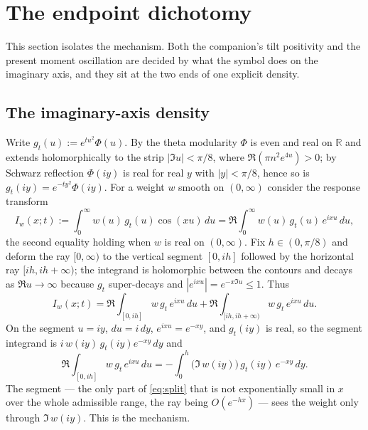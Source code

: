 \documentclass[11pt,reqno]{amsart}
\theoremstyle{plain}
\theoremstyle{definition}
\theoremstyle{remark}
\newcommand{\R}{\mathbb R}
\begin{document}
\section{The endpoint dichotomy}\label{sec:dichotomy}

This section isolates the mechanism. Both the companion's tilt positivity
and the present moment oscillation are decided by what the symbol does on
the imaginary axis, and they sit at the two ends of one explicit density.

\subsection{The imaginary-axis density}
Write $g_t(u):=e^{tu^2}\Phi(u)$. By the theta modularity $\Phi$ is even and
real on $\R$ and extends holomorphically to the strip $|\Im u|<\pi/8$, where
$\Re(\pi n^2e^{4u})>0$; by Schwarz reflection $\Phi(iy)$ is real for real
$y$ with $|y|<\pi/8$, hence so is $g_t(iy)=e^{-ty^2}\Phi(iy)$. For a weight
$w$ smooth on $(0,\infty)$ consider the response transform
\begin{equation}\label{eq:Iw}
  I_w(x;t):=\int_0^\infty w(u)\,g_t(u)\cos(xu)\,du
  =\Re\int_0^\infty w(u)\,g_t(u)\,e^{ixu}\,du ,
\end{equation}
the second equality holding when $w$ is real on $(0,\infty)$. Fix
$h\in(0,\pi/8)$ and deform the ray $[0,\infty)$ to the vertical segment
$[0,ih]$ followed by the horizontal ray $[ih,ih+\infty)$; the integrand is
holomorphic between the contours and decays as $\Re u\to\infty$ because
$g_t$ super-decays and $|e^{ixu}|=e^{-x\Im u}\le1$. Thus
\begin{equation}\label{eq:split}
  I_w(x;t)=\Re\!\int_{[0,ih]}\!w\,g_t\,e^{ixu}\,du
          +\Re\!\int_{[ih,ih+\infty)}\!w\,g_t\,e^{ixu}\,du .
\end{equation}
On the segment $u=iy$, $du=i\,dy$, $e^{ixu}=e^{-xy}$, and $g_t(iy)$ is real,
so the segment integrand is $i\,w(iy)\,g_t(iy)e^{-xy}\,dy$ and
\begin{equation}\label{eq:segment}
  \Re\!\int_{[0,ih]}w\,g_t\,e^{ixu}\,du
  =-\int_0^h \bigl(\Im\,w(iy)\bigr)\,g_t(iy)\,e^{-xy}\,dy .
\end{equation}
The segment --- the only part of \eqref{eq:split} that is not exponentially
small in $x$ over the whole admissible range, the ray being
$O(e^{-hx})$ --- sees the weight only through $\Im\,w(iy)$. This is the
mechanism.
\end{document}

